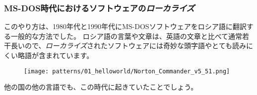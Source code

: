 \subsubsection{MS-DOS時代におけるソフトウェアの\emph{ローカライズ}}

このやり方は、1980年代と1990年代にMS-DOSソフトウェアをロシア語に翻訳する一般的な方法でした。 ロシア語の言葉や文章は、英語の文章と比べて通常若干長いので、\emph{ローカライズ}されたソフトウェアには奇妙な頭字語やとても読みにくい略語が含まれています。

\begin{figure}[H]
\centering
\texttt{[image: patterns/01\_helloworld/Norton\_Commander\_v5\_51.png]}
\caption{\JAph{}}
\end{figure}

他の国の他の言語でも、この時代に起きていたことでしょう。
